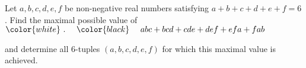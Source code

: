 Let $a,b,c,d,e,f$ be non-negative real numbers satisfying $a+b+c+d+e+f=6$. Find the maximal possible value of$\color{white}\ .\quad \ \color{black}\ \quad abc+bcd+cde+def+efa+fab$

and determine all $6$-tuples $(a,b,c,d,e,f)$ for which this maximal value is achieved.